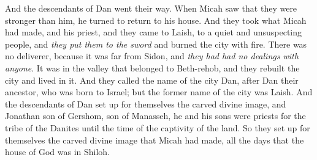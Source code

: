 \begin{biblechapter}
\verse And the descendants of Dan went their way. When Micah saw that they were stronger than him, he turned to return to his house.
\verse And they took what Micah had made, and his priest, and they came to Laish, to a quiet and unsuspecting people, and \textit{they put them to the sword} and burned the city with fire.
\verse There was no deliverer, because it was far from Sidon, and \textit{they had had no dealings with anyone}. It was in the valley that belonged to Beth-rehob, and they rebuilt the city and lived in it.
\verse And they called the name of the city Dan, after Dan their ancestor, who was born to Israel; but the former name of the city was Laish.
\verse And the descendants of Dan set up for themselves the carved divine image, and Jonathan son of Gershom, son of Manasseh, he and his sons were priests for the tribe of the Danites until the time of the captivity of the land.
\verse So they set up for themselves the carved divine image that Micah had made, all the days that the house of God was in Shiloh.
\end{biblechapter}


